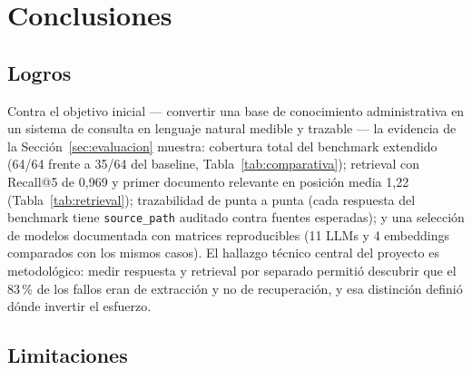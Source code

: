 \documentclass[11pt,a4paper]{article}
\newcommand{\code}[1]{\texttt{#1}}
\begin{document}
\section{Conclusiones}

\subsection{Logros}

Contra el objetivo inicial --- convertir una base de conocimiento
administrativa en un sistema de consulta en lenguaje natural medible y
trazable --- la evidencia de la Sección~\ref{sec:evaluacion} muestra:
cobertura total del benchmark extendido (64/64 frente a 35/64 del baseline,
Tabla~\ref{tab:comparativa}); retrieval con Recall@5 de 0{,}969 y primer
documento relevante en posición media 1{,}22 (Tabla~\ref{tab:retrieval});
trazabilidad de punta a punta (cada respuesta del benchmark tiene
\code{source\_path} auditado contra fuentes esperadas); y una selección de
modelos documentada con matrices reproducibles (11 LLMs y 4 embeddings
comparados con los mismos casos). El hallazgo técnico central del proyecto
es metodológico: medir respuesta y retrieval por separado permitió descubrir
que el 83\,\% de los fallos eran de extracción y no de recuperación, y esa
distinción definió dónde invertir el esfuerzo.

\subsection{Limitaciones}\label{sec:limitaciones}
\end{document}
